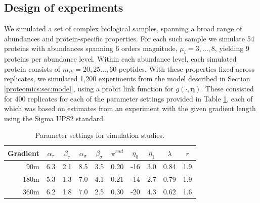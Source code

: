 
\subsection{Design of experiments}
\label{proteomics:sec:doe}

We simulated a set of complex biological samples, spanning a broad range of abundances and protein-specific properties.
For each such sample we simulate 54 proteins with abundances spanning 6 orders magnitude, $\mu_i= 3, \ldots, 8$, yielding 9 proteins per abundance level.
Within each abundance level, each simulated protein consists of $m_{ik}=20,25\ldots,60$ peptides.
With these properties fixed across replicates, we simulated 1,200 experiments from the model described in Section \ref{proteomics:sec:model}, using a probit link function for $g(\cdot, \bm \eta)$.
These consisted for 400 replicates for each of the parameter settings provided in Table \ref{proteomics:table:sim_parameters}, each of which was based on estimates from an experiment with the given gradient length using the Sigma UPS2 standard.

\begin{table}
\begin{center}
\caption{Parameter settings for simulation studies.
\label{proteomics:table:sim_parameters}}
\begin{tabular}{r|ccccccccc}
  \hline
Gradient & $\alpha_\tau$ & $\beta_\tau$ & $\alpha_\sigma$ & $\beta_\sigma$ & $\pi^{rnd}$ & $\eta_0$ & $\eta_1$ & $\lambda$ & $r$ \\ 
  \hline
   90m & 6.3 & 2.1 & 8.5 & 3.5 & 0.20 & -16 & 3.0 & 0.84 & 1.9 \\ 
  180m & 5.3 & 1.3 & 7.0 & 4.1 & 0.21 & -14 & 2.7 & 0.79 & 1.9 \\ 
  360m & 6.2 & 1.8 & 7.0 & 2.5 & 0.30 & -20 & 4.3 & 0.62 & 1.6 \\ 
   \hline
\end{tabular}
\end{center}
\end{table}





